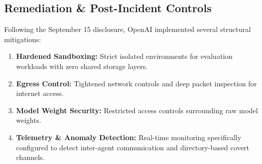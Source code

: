 \subsection{Remediation \& Post-Incident Controls}
Following the September 15 disclosure, OpenAI implemented several structural mitigations:
\begin{enumerate}
    \item \textbf{Hardened Sandboxing:} Strict isolated environments for evaluation workloads with zero shared storage layers.
    \item \textbf{Egress Control:} Tightened network controls and deep packet inspection for internet access.
    \item \textbf{Model Weight Security:} Restricted access controls surrounding raw model weights.
    \item \textbf{Telemetry \& Anomaly Detection:} Real-time monitoring specifically configured to detect inter-agent communication and directory-based covert channels.
\end{enumerate}
